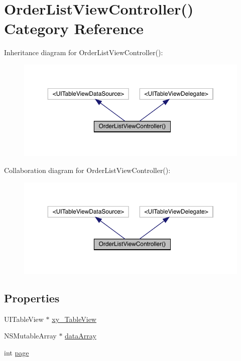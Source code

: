 \hypertarget{category_order_list_view_controller_07_08}{}\section{Order\+List\+View\+Controller() Category Reference}
\label{category_order_list_view_controller_07_08}


Inheritance diagram for Order\+List\+View\+Controller()\+:\nopagebreak
\begin{figure}[H]
\begin{center}
\leavevmode
\includegraphics[width=350pt]{category_order_list_view_controller_07_08__inherit__graph}
\end{center}
\end{figure}


Collaboration diagram for Order\+List\+View\+Controller()\+:\nopagebreak
\begin{figure}[H]
\begin{center}
\leavevmode
\includegraphics[width=350pt]{category_order_list_view_controller_07_08__coll__graph}
\end{center}
\end{figure}
\subsection*{Properties}
\begin{DoxyCompactItemize}
\item 
U\+I\+Table\+View $\ast$ \mbox{\hyperlink{category_order_list_view_controller_07_08_a21083b7bd562dd270bc147a81a01cd7f}{xy\+\_\+\+Table\+View}}
\item 
N\+S\+Mutable\+Array $\ast$ \mbox{\hyperlink{category_order_list_view_controller_07_08_a03aba3ab777d91753302c8e254fc892d}{data\+Array}}
\item 
int \mbox{\hyperlink{category_order_list_view_controller_07_08_a8aa19081bfabd2c1c8755c76015669bf}{page}}
\end{DoxyCompactItemize}


